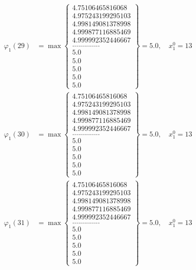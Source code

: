 \documentclass{article}
\begin{document}
\begin{align*}
  
  
  
\varphi_{1}(29) &= \max \left\{ \begin{array}{c}
4.75106465816068 \\
 4.975243199295103 \\
 4.998149081378998 \\
 4.999877116885469 \\
 4.999992352446667 \\
 .............. \\
 5.0 \\
 5.0 \\
 5.0 \\
 5.0 \\
 5.0
\end{array} \right\} = 5.0, \quad x_{1}^0 = 13\\
  
  
  
  
\varphi_{1}(30) &= \max \left\{ \begin{array}{c}
4.75106465816068 \\
 4.975243199295103 \\
 4.998149081378998 \\
 4.999877116885469 \\
 4.999992352446667 \\
 .............. \\
 5.0 \\
 5.0 \\
 5.0 \\
 5.0 \\
 5.0
\end{array} \right\} = 5.0, \quad x_{1}^0 = 13\\
  
  
  
  
\varphi_{1}(31) &= \max \left\{ \begin{array}{c}
4.75106465816068 \\
 4.975243199295103 \\
 4.998149081378998 \\
 4.999877116885469 \\
 4.999992352446667 \\
 .............. \\
 5.0 \\
 5.0 \\
 5.0 \\
 5.0 \\
 5.0
\end{array} \right\} = 5.0, \quad x_{1}^0 = 13\\
  

\end{align*}
\end{document}
